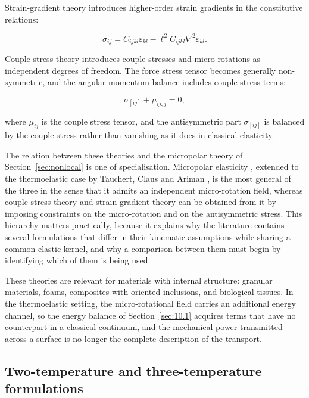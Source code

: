 Strain-gradient theory introduces higher-order strain gradients in the constitutive relations:

\begin{equation}
\sigma_{ij} = C_{ijkl}\varepsilon_{kl} - \ell^2 C_{ijkl}\nabla^2\varepsilon_{kl}.
\label{eq:11.5}
\end{equation}

Couple-stress theory introduces couple stresses and micro-rotations as independent degrees of freedom. The force stress tensor becomes generally non-symmetric, and the angular momentum balance includes couple stress terms:

\begin{equation}
\sigma_{[ij]} + \mu_{ij,j} = 0,
\label{eq:11.6}
\end{equation}

where $\mu_{ij}$ is the couple stress tensor, and the antisymmetric part $\sigma_{[ij]}$ is balanced by the couple stress rather than vanishing as it does in classical elasticity.

The relation between these theories and the micropolar theory of Section~\ref{sec:nonlocal} is one of specialisation. Micropolar elasticity \cite{Eringen1966a}, extended to the thermoelastic case by Tauchert, Claus and Ariman \cite{Eringen1968b}, is the most general of the three in the sense that it admits an independent micro-rotation field, whereas couple-stress theory and strain-gradient theory can be obtained from it by imposing constraints on the micro-rotation and on the antisymmetric stress. This hierarchy matters practically, because it explains why the literature contains several formulations that differ in their kinematic assumptions while sharing a common elastic kernel, and why a comparison between them must begin by identifying which of them is being used.

These theories are relevant for materials with internal structure: granular materials, foams, composites with oriented inclusions, and biological tissues. In the thermoelastic setting, the micro-rotational field carries an additional energy channel, so the energy balance of Section~\ref{sec:10.1} acquires terms that have no counterpart in a classical continuum, and the mechanical power transmitted across a surface is no longer the complete description of the transport.

\subsection{Two-temperature and three-temperature formulations}
\label{sec:11.3}

